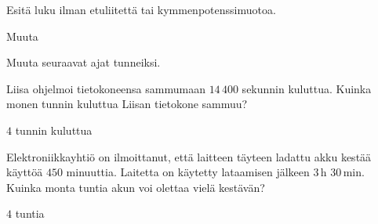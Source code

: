 \begin{tehtavasivu}

\begin{tehtava}
Esitä luku ilman etuliitettä tai kymmenpotenssimuotoa.
\begin{vastaus}
\end{vastaus}
\end{tehtava}


\begin{tehtava}
Muuta
  \begin{vastaus}
  \end{vastaus}
\end{tehtava}

\begin{tehtava}
Muuta seuraavat ajat tunneiksi.
	\begin{vastaus}
	\end{vastaus}
\end{tehtava}

\begin{tehtava}
Liisa ohjelmoi tietokoneensa sammumaan $14\,400$ sekunnin kuluttua. Kuinka monen tunnin kuluttua Liisan tietokone sammuu?
\begin{vastaus}
$4$ tunnin kuluttua
\end{vastaus}
\end{tehtava}

\begin{tehtava}
Elektroniikkayhtiö on ilmoittanut, että laitteen täyteen ladattu akku kestää käyttöä $450$ minuuttia. Laitetta on käytetty lataamisen jälkeen $3$\,h $30$\,min. Kuinka monta tuntia akun voi olettaa vielä kestävän?
\begin{vastaus}
$4$ tuntia
\end{vastaus}
\end{tehtava}


\end{tehtavasivu}
